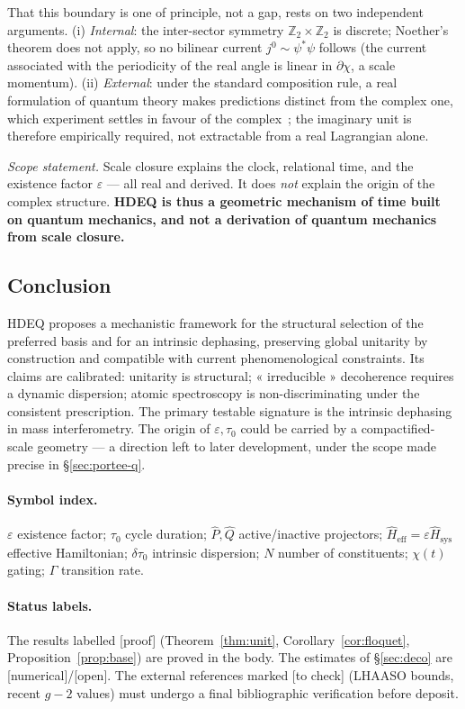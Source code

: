 \documentclass[11pt,a4paper]{article}
\newcommand{\Hsysop}{\hat{H}_{\mathrm{sys}}}
\newcommand{\Heff}{\hat{H}_{\mathrm{eff}}}
\newcommand{\statut}[1]{{\footnotesize\textsf{[#1]}}}
\theoremstyle{plain}
\theoremstyle{definition}
\theoremstyle{remark}
\begin{document}
That this boundary is one of principle, not a gap, rests on two independent arguments. (i) \emph{Internal}: the inter-sector symmetry $\mathbb{Z}_2\times\mathbb{Z}_2$ is discrete; Noether's theorem does not apply, so no bilinear current $j^0\sim\psi^*\psi$ follows (the current associated with the periodicity of the real angle is linear in $\partial\chi$, a scale momentum). (ii) \emph{External}: under the standard composition rule, a real formulation of quantum theory makes predictions distinct from the complex one, which experiment settles in favour of the complex~\cite{Renou,Chen}; the imaginary unit is therefore empirically required, not extractable from a real Lagrangian alone.

\emph{Scope statement.} Scale closure explains the clock, relational time, and the existence factor $\varepsilon$ --- all real and derived. It does \emph{not} explain the origin of the complex structure. \textbf{HDEQ is thus a geometric mechanism of time built on quantum mechanics, and not a derivation of quantum mechanics from scale closure.}

\subsection{Conclusion}
HDEQ proposes a mechanistic framework for the structural selection of the
preferred basis and for an intrinsic dephasing, preserving global unitarity by
construction and compatible with current phenomenological constraints. Its claims
are calibrated: unitarity is structural; « irreducible » decoherence requires a
dynamic dispersion; atomic spectroscopy is non-discriminating under the consistent
prescription. The primary testable signature is the intrinsic dephasing in mass
interferometry. The origin of $\varepsilon,\tau_0$ could be carried by a
compactified-scale geometry --- a direction left to later development, under the scope made precise in \S\ref{sec:portee-q}.

\paragraph{Symbol index.}
$\varepsilon$ existence factor; $\tau_0$ cycle duration; $\hat P,\hat Q$
active/inactive projectors; $\Heff=\varepsilon\Hsysop$ effective Hamiltonian;
$\delta\tau_0$ intrinsic dispersion; $N$ number of constituents; $\chi(t)$ gating;
$\Gamma$ transition rate.

\paragraph{Status labels.} The results labelled \statut{proof}
(Theorem~\ref{thm:unit}, Corollary~\ref{cor:floquet}, Proposition~\ref{prop:base})
are proved in the body. The estimates of \S\ref{sec:deco} are
\statut{numerical}/\statut{open}. The external references marked \statut{to check}
(LHAASO bounds, recent $g-2$ values) must undergo a final bibliographic
verification before deposit.
\end{document}
